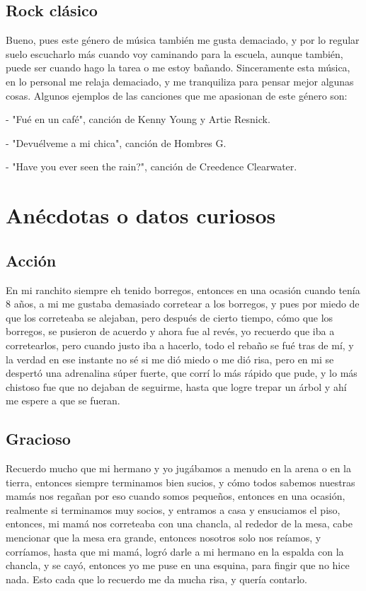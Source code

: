 \documentclass[letterpaper,12pt]{article}
\begin{document}
    \subsection{\Large{Rock clásico}} \large{Bueno, pues este género de música también me gusta demaciado, y por lo regular suelo escucharlo más cuando voy caminando para la escuela, aunque también, puede ser cuando hago la tarea o me estoy bañando. Sinceramente esta música, en lo personal me relaja demaciado, y me tranquiliza para pensar mejor algunas cosas. Algunos ejemplos de las canciones que me apasionan de este género son:
    
    - "Fué en un café", canción de Kenny Young y Artie Resnick.
    
    - "Devuélveme a mi chica", canción de Hombres G.
    
    - "Have you ever seen the rain?", canción de Creedence Clearwater.}
    
\section{\huge{Anécdotas o datos curiosos}} 
    \subsection{\Large{Acción}} \large{En mi ranchito siempre eh tenido borregos, entonces en una ocasión cuando tenía 8 años, a mi me gustaba demasiado corretear a los borregos, y pues por miedo de que los correteaba se alejaban, pero después de cierto tiempo, cómo que los borregos, se pusieron de acuerdo y ahora fue al revés, yo recuerdo que iba a corretearlos, pero cuando justo iba a hacerlo, todo el rebaño se fué tras de mí, y la verdad en ese instante no sé si me dió miedo o me dió risa, pero en mi se despertó una adrenalina súper fuerte, que corrí lo más rápido que pude, y lo más chistoso fue que no dejaban de seguirme, hasta que logre trepar un árbol y ahí me espere a que se fueran.}

    \subsection{\Large{Gracioso}} \large{Recuerdo mucho que mi hermano y yo jugábamos a menudo en la arena o en la tierra, entonces siempre terminamos bien sucios, y cómo todos sabemos nuestras mamás nos regañan por eso cuando somos pequeños, entonces en una ocasión, realmente si terminamos muy socios, y entramos a casa y ensuciamos el piso, entonces, mi mamá nos correteaba con una chancla, al rededor de la mesa, cabe mencionar que la mesa era grande, entonces nosotros solo nos reíamos, y corríamos, hasta que mi mamá, logró darle a mi hermano en la espalda con la chancla, y se cayó, entonces yo me puse en una esquina, para fingir que no hice nada. Esto cada que lo recuerdo me da mucha risa, y quería contarlo.}
    
\end{document}
